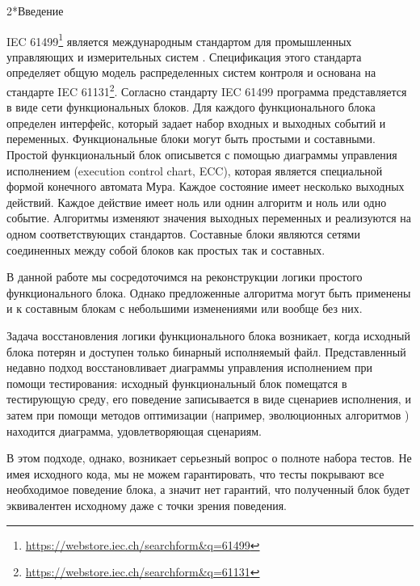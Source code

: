 \documentclass[14pt]{extarticle}
\makeatletter
\theoremstyle{plain}
\theoremstyle{definition}
\renewcommand{\subsection}{\@startsection{subsection}{2}{0mm}%
{2\baselineskip}{\baselineskip}{\bfseries\large\itshape}}
\makeatother
\begin{document}
\pagebreak

\clearpage
\setcounter{page}{3}

\tableofcontents

\pagebreak

\subsection*{Введение}

IEC 61499\footnote{\url{https://webstore.iec.ch/searchform&q=61499}}
является международным стандартом для промышленных управляющих и
измерительных систем \cite{iec}. Спецификация этого стандарта определяет общую модель
распределенных систем контроля и основана на стандарте
IEC 61131\footnote{\url{https://webstore.iec.ch/searchform&q=61131}}. Согласно
стандарту IEC 61499 программа представляется в виде сети функциональных блоков.
Для каждого функционального блока определен интерфейс, который задает набор
входных и выходных событий и переменных. Функциональные блоки могут быть
простыми и составными. Простой функциональный блок описывется с помощью
диаграммы управления исполнением (execution control chart, ECC), которая является специальной формой конечного
автомата Мура. Каждое состояние имеет несколько выходных действий. Каждое
действие имеет ноль или однин алгоритм и ноль или одно событие. Алгоритмы
изменяют значения выходных переменных и реализуются на одном соответствующих
стандартов. Составные блоки являются сетями соединенных между собой блоков
как простых так и составных.

В данной работе мы сосредоточимся на реконструкции логики простого
функционального блока. Однако предложенные алгоритма могут быть применены и к
составным блокам с небольшими изменениями или вообще без них.

Задача восстановления логики функционального блока возникает, когда исходный
блока потерян и доступен только бинарный исполняемый файл. Представленный
недавно подход \cite{rec} восстановливает диаграммы управления исполнением при помощи
тестирования: исходный функциональный блок помещатся в тестирующую среду, его
поведение записывается в виде сценариев исполнения, и затем при помощи
методов оптимизации (например, эволюционных алгоритмов \cite{ea}) находится диаграмма, удовлетворяющая сценариям.

В этом подходе, однако, возникает серьезный вопрос о полноте набора тестов.
Не имея исходного кода, мы не можем гарантировать, что тесты покрывают все
необходимое поведение блока, а значит нет гарантий, что полученный блок будет
эквивалентен исходному даже с точки зрения поведения.
\end{document}
